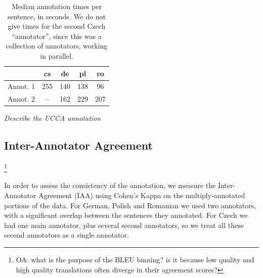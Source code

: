 \documentclass[11pt]{article}
\newcommand{\oa}[1]{\footnote{\color{red}OA: #1}}
\begin{document}
\begin{table}
\begin{center}
\begin{tabular}{l|cccc}
& cs & de & pl & ro \\
\hline
Annot. 1 & 255 & 140  & 138 & 96 \\
Annot. 2 & -- & 162 & 229 & 207 \\
\end{tabular}
\caption{Median annotation times per sentence, in seconds.
We do not give times for the second Czech 
``annotator'', since this was a collection of annotators, working in parallel.}
\label{tab:annot_times}
\end{center}
\end{table}


\emph{Describe the UCCA annotation}





\subsection{Inter-Annotator Agreement}
\label{sec:iaa}

\oa{what is the purpose of the BLEU binning? is it because low quality and high
quality translations often diverge in their agreement scores?}



In order to assess the consistency of the annotation, we measure the Inter-Annotator
Agreement (IAA) using Cohen's Kappa on the multiply-annotated portions of the data.
For German, Polish and Romanian we used two annotators, with a significant overlap
between the sentences they annotated. For Czech we had one main annotator, plus
several second annotators, so we treat all these second annotators as a single
annotator. 
\end{document}
